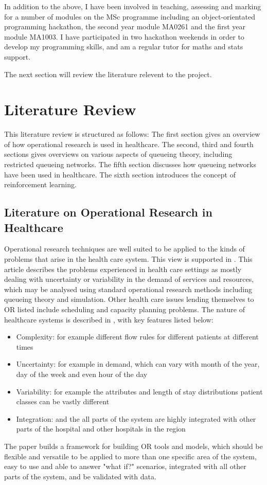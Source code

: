 \documentclass{article}
\begin{document}
In addition to the above, I have been involved in teaching, assessing and
marking for a number of modules on the MSc programme including an object-orientated programming hackathon, the second year module
MA0261 and the first year module MA1003.
I have participated in two hackathon weekends in order to develop my programming skills, and am a regular tutor for maths and stats support.

The next section will review the literature relevent to the project.

\section{Literature Review}

This literature review is structured as follows:
The first section gives an overview of how operational research is used in healthcare.
The second, third and fourth sections gives overviews on various aspects of queueing theory, including restricted queueing networks.
The fifth section discusses how queueing networks have been used in healthcare.
The sixth section introduces the concept of reinforcement learning.

\subsection{Literature on Operational Research in Healthcare}

Operational research techniques are well suited to be applied to the kinds of problems that arise in the health care system.
This view is supported in \cite{buhaug02}.
This article describes the problems experienced in health care settings as mostly dealing with uncertainty or variability in the demand of services and resources, which may be analysed using standard operational research methods including queueing theory and simulation.
Other health care issues lending themselves to OR listed include scheduling and capacity planning problems.
The nature of healthcare systems is described in \cite{harper02}, with key features listed below:
\begin{itemize}
    \item Complexity: for example different flow rules for different patients at different times
    \item Uncertainty: for example in demand, which can vary with month of the year, day of the week and even hour of the day
    \item Variability: for example the attributes and length of stay distributions patient classes can be vastly different
    \item Integration: and the all parts of the system are highly integrated with other parts of the hospital and other hospitals in the region
\end{itemize}
The paper builds a framework for building OR tools and models, which should be flexible and versatile to be applied to more than one specific area of the system, easy to use and able to answer "what if?" scenarios, integrated with all other parts of the system, and be validated with data.
\end{document}
